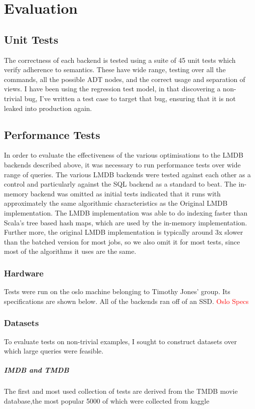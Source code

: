 \documentclass[12pt,a4paper,twoside,openright]{report}
\newcommand\todo[1]{\textcolor{red}{#1}}
\begin{document}
\chapter{Evaluation}
\section{Unit Tests}
The correctness of each backend is tested using a suite of 45 unit tests which verify adherence to semantics. These have  wide range, testing over all the commands, all the possible ADT nodes, and the correct usage and separation of views. I have been using the regression test model, in that discovering a non-trivial bug, I've written a test case to target that bug, ensuring that it is not leaked into production again.
\section{Performance Tests}
	In order to evaluate the effectiveness of the various optimisations to the LMDB backends described above, it was necessary to run performance tests over wide range of queries. The various LMDB backends were tested against each other as a control and particularly against the SQL backend as a standard to beat. The in-memory backend was omitted as initial tests indicated that it runs with approximately the same algorithmic characteristics as the Original LMDB implementation. The LMDB implementation was able to do indexing faster than Scala's tree based hash maps, which are used by the in-memory implementation. Further more, the original LMDB implementation is typically around 3x slower than the batched version for most jobs, so we also omit it for most tests, since most of the algorithms it uses are the same.
	\subsection{Hardware}
	Tests were run on the oslo machine belonging to Timothy Jones' group. Its specifications are shown below. All of the backends ran off of an SSD.
	\todo{Oslo Specs}
	\subsection{Datasets}
	To evaluate tests on non-trivial examples, I sought to construct datasets over which large queries were feasible.

		\paragraph{IMDB and TMDB}
		The first and most used collection of tests are derived from the TMDB movie database,the most popular 5000 of which were collected from kaggle \cite{TMDB5000}
\end{document}

